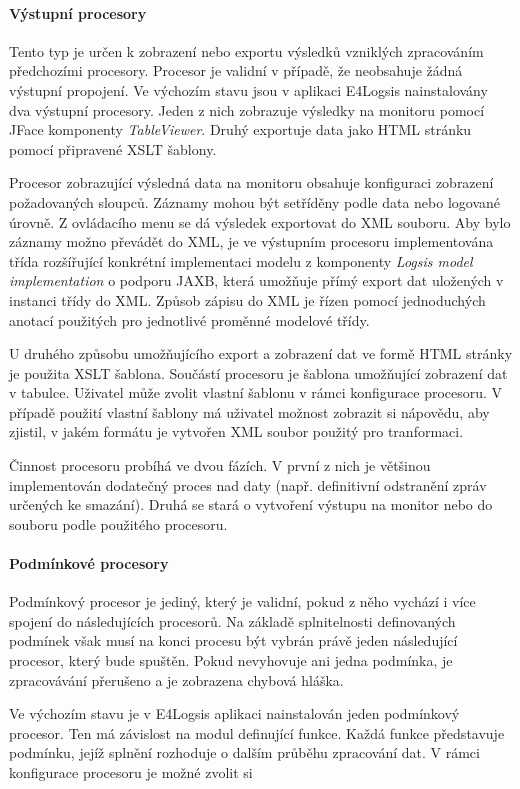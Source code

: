 \documentclass[ing,male,java,dept460]{diploma}		%
\begin{document}
\paragraph{Výstupní procesory}
Tento typ je určen k zobrazení nebo exportu výsledků vzniklých zpracováním předchozími procesory. Procesor je validní v případě, že neobsahuje žádná výstupní propojení. Ve výchozím stavu jsou v aplikaci E4Logsis nainstalovány dva výstupní procesory. Jeden z nich zobrazuje výsledky na monitoru pomocí JFace komponenty \textit{TableViewer}. Druhý exportuje data jako HTML stránku pomocí připravené XSLT šablony.
\par Procesor zobrazující výsledná data na monitoru obsahuje konfiguraci zobrazení požadovaných sloupců. Záznamy mohou být setříděny podle data nebo logované úrovně. Z ovládacího menu se dá výsledek exportovat do XML souboru. Aby bylo záznamy možno převádět do XML, je ve výstupním procesoru implementována třída rozšířující konkrétní implementaci modelu z komponenty \textit{Logsis model implementation} o podporu JAXB, která umožňuje přímý export dat uložených v instanci třídy do XML. Způsob zápisu do XML je řízen pomocí jednoduchých anotací použitých pro jednotlivé proměnné modelové třídy.
\par U druhého způsobu umožňujícího export a zobrazení dat ve formě HTML stránky je použita XSLT šablona. Součástí procesoru je šablona umožňující zobrazení dat v tabulce. Uživatel může zvolit vlastní šablonu v rámci konfigurace procesoru. V případě použití vlastní šablony má uživatel možnost zobrazit si nápovědu, aby zjistil, v jakém formátu je vytvořen XML soubor použitý pro tranformaci.
\par Činnost procesoru probíhá ve dvou fázích. V první z nich je většinou implementován dodatečný proces nad daty (např. definitivní odstranění zpráv určených ke smazání). Druhá se stará o vytvoření výstupu na monitor nebo do souboru podle použitého procesoru.

\paragraph{Podmínkové procesory}
Podmínkový procesor je jediný, který je validní, pokud z něho vychází i více spojení do následujících procesorů. Na základě splnitelnosti definovaných podmínek však musí na konci procesu být vybrán právě jeden následující procesor, který bude spuštěn. Pokud nevyhovuje ani jedna podmínka, je zpracovávání přerušeno a je zobrazena chybová hláška.
\par Ve výchozím stavu je v E4Logsis aplikaci nainstalován jeden podmínkový procesor. Ten má závislost na modul definující funkce. Každá funkce představuje podmínku, jejíž splnění rozhoduje o dalším průběhu zpracování dat. V rámci konfigurace procesoru je možné zvolit si 
\end{document}
